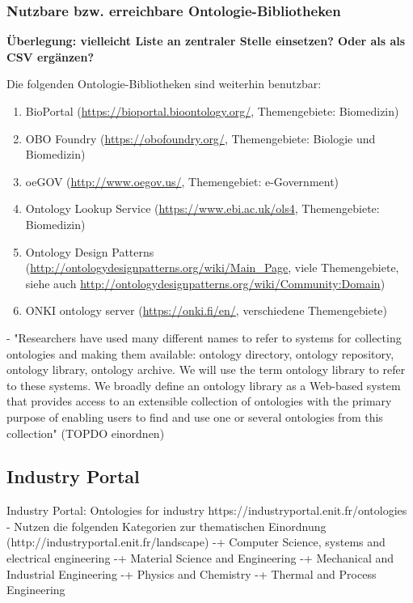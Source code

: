\documentclass{article}
\begin{document}
\subsubsection{Nutzbare bzw. erreichbare Ontologie-Bibliotheken}

\textbf{Überlegung: vielleicht Liste an zentraler Stelle einsetzen? Oder als als CSV ergänzen?}

Die folgenden Ontologie-Bibliotheken sind weiterhin benutzbar:

\begin{enumerate}
    \item BioPortal (\url{https://bioportal.bioontology.org/}, Themengebiete: Biomedizin)
    \item OBO Foundry (\url{https://obofoundry.org/}, Themengebiete: Biologie und Biomedizin)
    \item oeGOV (\url{http://www.oegov.us/}, Themengebiet: e-Government)
    \item Ontology Lookup Service (\url{https://www.ebi.ac.uk/ols4}, Themengebiete: Biomedizin)
    \item Ontology Design Patterns (\url{http://ontologydesignpatterns.org/wiki/Main\_Page}, viele Themengebiete, siehe auch \url{http://ontologydesignpatterns.org/wiki/Community:Domain})
    \item ONKI ontology server (\url{https://onki.fi/en/}, verschiedene Themengebiete)
\end{enumerate}


- "Researchers have used many different names to refer to systems for collecting ontologies
and making them available: ontology directory, ontology repository, ontology library,
ontology archive. We will use the term ontology library to refer to these systems. We
broadly define an ontology library as a Web-based system that provides access to an
extensible collection of ontologies with the primary purpose of enabling users to find and
use one or several ontologies from this collection" (TOPDO einordnen)





\subsection{Industry Portal}

Industry Portal: Ontologies for industry https://industryportal.enit.fr/ontologies
- Nutzen die folgenden Kategorien zur thematischen Einordnung (http://industryportal.enit.fr/landscape)
-+ Computer Science, systems and electrical engineering
-+ Material Science and Engineering
-+ Mechanical and Industrial Engineering
-+ Physics and Chemistry
-+ Thermal and Process Engineering
\end{document}
